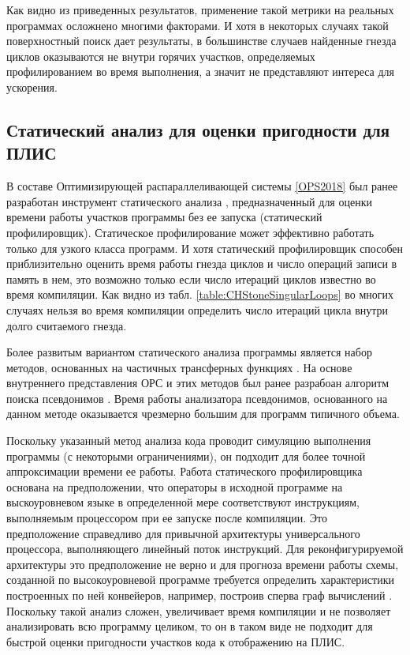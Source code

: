 \documentclass[utf8]{psta}%
\begin{document}
Как видно из приведенных результатов, применение такой метрики на реальных программах осложнено многими факторами. И хотя в некоторых случаях такой поверхностный поиск дает результаты, в большинстве случаев найденные гнезда циклов оказываются не внутри горячих участков, определяемых профилированием во время выполнения, а значит не представляют интереса для ускорения.

\subsection{Статический анализ для оценки пригодности для ПЛИС}

В составе Оптимизирующей распараллеливающей системы \ref{OPS2018} был ранее разработан инструмент статического анализа \cite{2010}, предназначенный для оценки времени работы участков программы без ее запуска (статический профилировщик). Статическое профилирование может эффективно работать только для узкого класса программ. И хотя статический профилировщик способен приблизительно оценить время работы гнезда циклов и число операций записи в память в нем, это возможно только если число итераций циклов известно во время компиляции. Как видно из табл. \ref{table:CHStoneSingularLoops} во многих случаях нельзя во время компиляции определить число итераций цикла внутри долго считаемого гнезда.

Более развитым вариантом статического анализа программы является набор методов, основанных на частичных трансферных функциях \cite{PartialTransferFunctions}. На основе внутреннего представления ОРС и этих методов был ранее разрабоан алгоритм поиска псевдонимов \cite{Poluyan2010}. Время работы анализатора псевдонимов, основанного на данном методе оказывается чрезмерно большим для программ типичного объема. 

Поскольку указанный метод анализа кода проводит симуляцию выполнения программы (с некоторыми ограничениями), он подходит для более точной аппроксимации времени ее работы. Работа статического профилировщика основана на предположении, что операторы в исходной программе на выскоуровневом языке в определенной мере соответствуют инструкциям, выполняемым процессором при ее запуске после компиляции. Это предположение справедливо для привычной архитектуры универсального процессора, выполняющего линейный поток инструкций. Для реконфигурируемой архитектуры это предположение не верно и для прогноза времени работы схемы, созданной по высокоуровневой программе требуется определить характеристики построенных по ней конвейеров, например, построив сперва граф вычислений \cite{Steinberg2016}. Поскольку такой анализ сложен, увеличивает время компиляции и не позволяет анализировать всю программу целиком, то он в таком виде не подходит для быстрой оценки пригодности участков кода к отображению на ПЛИС.
\end{document}
